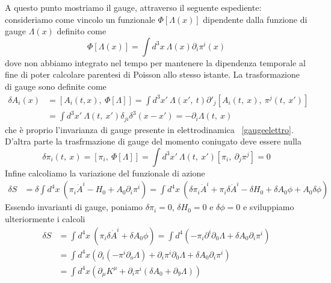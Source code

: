     A questo punto mostriamo il gauge, attraverso il seguente espediente: consideriamo come vincolo un funzionale $\Phi[\Lambda(x)]$ dipendente dalla funzione di gauge $\Lambda(x)$ definito come
\begin{equation*}
    \Phi[\Lambda(x)] = \int d^3 x ~ \Lambda(x) \partial_i \pi^i(x)
\end{equation*}
    dove non abbiamo integrato nel tempo per mantenere la dipendenza temporale al fine di poter calcolare parentesi di Poisson allo stesso istante. La trasformazione di gauge sono definite come 
\begin{equation*}
\begin{aligned}
    \delta A_i (x) & = [A_i(t, x), ~\Phi[\Lambda]] = \int d^3 x' ~ \Lambda(x', ~t) \partial'_j [A_i(t, ~x), ~ \pi^j(t, ~x')] \\ & = \int d^3 x' ~ \Lambda(t, ~x') \delta_{ji} \delta^3 (x-x') = - \partial_i \Lambda(t, ~x)
\end{aligned}
\end{equation*}
    che è proprio l'invarianza di gauge presente in elettrodinamica ~\eqref{gaugeelettro}. D'altra parte la trasfrmazione di gauge del momento coniugato deve essere nulla 
\begin{equation*}
    \delta \pi_i(t, ~x) = [\pi_i, ~\Phi[\Lambda]] = \int d^3 x' ~ \Lambda(t, ~x')[\pi_i, ~\partial_j \pi^j] = 0
\end{equation*}
    Infine calcoliamo la variazione del funzionale di azione 
\begin{equation*}
\begin{aligned}
    \delta S & = \delta \int d^4 x ~ ( \pi_i \dot A^i - H_0 + A_0 \partial_i \pi^i) = \int d^4 x ~ ( \delta \pi_i \dot A^i + \pi_i \delta \dot A^i - \delta H_0 + \delta A_0 \phi + A_0 \delta \phi )
\end{aligned}
\end{equation*}
    Essendo invarianti di gauge, poniamo $\delta \pi_i = 0$, $\delta H_0 = 0$ e $\delta \phi = 0$ e sviluppiamo ulteriormente i calcoli
\begin{equation*}
\begin{aligned}
    \delta S & = \int d^4 x ~ (\pi_i \delta \dot A^i + \delta A_0 \phi) = \int d^4 (-\pi_i\partial^i \partial_0 \Lambda + \delta A_0 \partial_i \pi^i ) \\ & = \int d^4 x (\partial_i (-\pi^i \partial_o \Lambda) + \partial_i \pi^i \partial_0 \Lambda + \delta A_0 \partial_i \pi^i ) \\ & = \int d^4 x (\partial_\mu K^\mu + \partial_i \pi^i (\delta A_0 + \partial_9 \Lambda))
\end{aligned}
\end{equation*}
